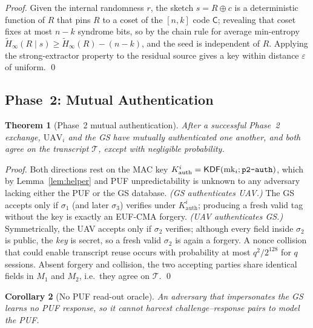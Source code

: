 \documentclass[11pt,a4paper]{article}
\newtheorem{theorem}{Theorem}
\newtheorem{corollary}[theorem]{Corollary}
\begin{document}
\begin{proof}
Given the internal randomness $r$, the sketch $s=R\oplus c$ is a deterministic
function of $R$ that pins $R$ to a coset of the $[n,k]$ code $\mathsf{C}$;
revealing that coset fixes at most $n-k$ syndrome bits, so by the chain rule for
average min-entropy $\widetilde{H}_\infty(R\mid s)\ge \widetilde{H}_\infty(R)-(n-k)$, and the seed is
independent of $R$. Applying the strong-extractor property to the residual
source gives a key within distance $\varepsilon$ of uniform. \qed
\end{proof}

\subsection{Phase~2: Mutual Authentication}

\begin{theorem}[Phase~2 mutual authentication]
\label{thm:mutual_auth}
After a successful Phase~2 exchange, $\text{UAV}_i$ and the GS have mutually
authenticated one another, and both agree on the transcript $\mathcal{T}$,
except with negligible probability.
\end{theorem}

\begin{proof}
Both directions rest on the MAC key $K^{i}_{\text{auth}}=\mathsf{KDF}(\text{mk}_i;\texttt{p2\text{-}auth})$,
which by Lemma~\ref{lem:helper} and PUF unpredictability is unknown to any
adversary lacking either the PUF or the GS database.
\emph{(GS authenticates UAV.)} The GS accepts only if $\sigma_1$ (and later
$\sigma_3$) verifies under $K^{i}_{\text{auth}}$; producing a fresh valid tag
without the key is exactly an EUF-CMA forgery.
\emph{(UAV authenticates GS.)} Symmetrically, the UAV accepts only if $\sigma_2$
verifies; although every field inside $\sigma_2$ is public, the \emph{key} is
secret, so a fresh valid $\sigma_2$ is again a forgery.
A nonce collision that could enable transcript reuse occurs with probability at
most $q^2/2^{128}$ for $q$ sessions. Absent forgery and collision, the two
accepting parties share identical fields in $M_1$ and $M_2$, i.e.\ they agree on
$\mathcal{T}$. \qed
\end{proof}

\begin{corollary}[No PUF read-out oracle]
\label{cor:oracle}
An adversary that impersonates the GS learns no PUF response, so it cannot
harvest challenge--response pairs to model the PUF.
\end{corollary}
\end{document}
